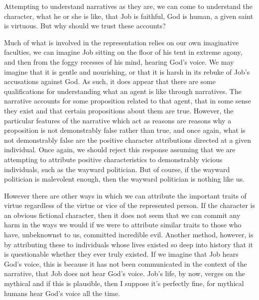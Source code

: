 \documentclass[
  12pt,
]{book}
\theoremstyle{definition}
\theoremstyle{definition}
\theoremstyle{definition}
\theoremstyle{definition}
\theoremstyle{remark}
\begin{document}
Attempting to understand narratives as they are, we can come to understand the character, what he or she is like, that Job is faithful, God is human, a given saint is virtuous. But why should we trust these accounts?

Much of what is involved in the representation relies on our own imaginative faculties, we can imagine Job sitting on the floor of his tent in extreme agony, and then from the foggy recesses of his mind, hearing God's voice. We may imagine that it is gentle and nourishing, or that it is harsh in its rebuke of Job's accusations against God. As such, it does appear that there are some qualifications for understanding what an agent is like through narratives. The narrative accounts for some proposition related to that agent, that in some sense they exist and that certain propositions about them are true. However, the particular features of the narrative which act as reasons are reasons why a proposition is not demonstrably false rather than true, and once again, what is not demonstrably false are the positive character attributions directed at a given individual. Once again, we should reject this response assuming that we are attempting to attribute positive characteristics to demonstrably vicious individuals, such as the wayward politician. But of course, if the wayward politician is malevolent enough, then the wayward politician is nothing like us.

However there are other ways in which we can attribute the important traits of virtue regardless of the virtue or vice of the represented person. If the character is an obvious fictional character, then it does not seem that we can commit any harm in the ways we would if we were to attribute similar traits to those who have, unbeknownst to us, committed incredible evil. Another method, however, is by attributing these to individuals whose lives existed so deep into history that it is questionable whether they ever truly existed. If we imagine that Job hears God's voice, this is because it has not been communicated in the context of the narrative, that Job does not hear God's voice. Job's life, by now, verges on the mythical and if this is plausible, then I suppose it's perfectly fine, for mythical humans hear God's voice all the time.
\end{document}
